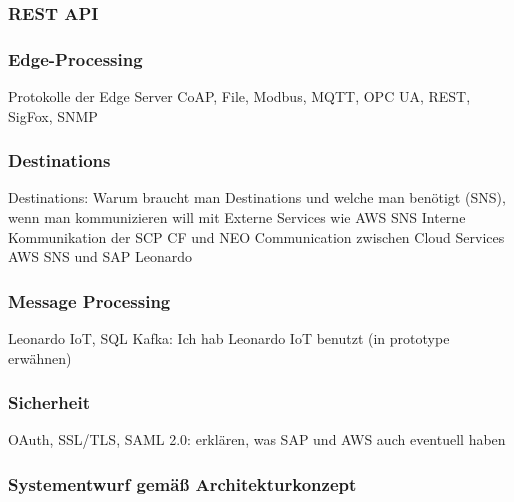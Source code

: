 \subsubsection{REST API}

\subsubsection{Edge-Processing}

Protokolle der Edge Server CoAP, File, Modbus, MQTT, OPC UA, REST, SigFox, SNMP
\subsubsection{Destinations}
Destinations: Warum braucht man Destinations und welche man benötigt (SNS),  wenn man kommunizieren will mit
Externe Services wie AWS SNS
Interne Kommunikation der SCP CF und NEO
Communication zwischen Cloud Services AWS SNS und SAP Leonardo

\subsubsection{Message Processing}
Leonardo IoT, SQL Kafka: Ich hab Leonardo IoT benutzt (in prototype erwähnen)

\subsubsection{Sicherheit}
OAuth, SSL/TLS, SAML 2.0: erklären, was SAP und AWS auch eventuell haben

\subsubsection{Systementwurf gemäß Architekturkonzept}
